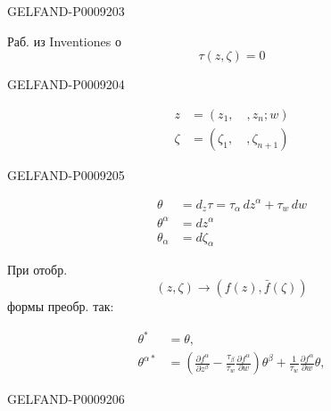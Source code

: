 \begin{GelfandAdjacentEvidence}{GELFAND-P000920}{3}


Раб. из Inventiones о 
\begin{equation*}
 \tau(z,\zeta)=0
 \tag{16}
\end{equation*}

\end{GelfandAdjacentEvidence}
\begin{GelfandAdjacentEvidence}{GELFAND-P000920}{4}


\begin{align*}
 z&=(z_1,\quad,z_n;w)\\
 \zeta&=(\zeta_1,\quad,\zeta_{n+1})
\end{align*}
\end{GelfandAdjacentEvidence}
\begin{GelfandAdjacentEvidence}{GELFAND-P000920}{5}


\begin{align*}
 \theta&=d_z\tau=\tau_\alpha\,dz^\alpha+\tau_w\,dw\\
 \theta^\alpha&=dz^\alpha\\
 \theta_\alpha&=d\zeta_\alpha
\end{align*}

При отобр.
\begin{equation*}
 (z,\zeta)\to(f(z),\bar f(\zeta))
 \tag{17}
\end{equation*}
формы преобр. так:

\begin{equation*}
 \begin{aligned}
 \theta^*&=\theta,\\
 \theta^{\alpha*}&=\left(\frac{\partial f^\alpha}{\partial z^\beta}
       -\frac{\tau_\beta}{\tau_w}\frac{\partial f^\alpha}{\partial w}\right)\theta^\beta
       +\frac{1}{\tau_w}\frac{\partial f^\alpha}{\partial w}\theta,
 \end{aligned}
 \tag{18}
\end{equation*}
\end{GelfandAdjacentEvidence}
\begin{GelfandAdjacentEvidence}{GELFAND-P000920}{6}

\end{GelfandAdjacentEvidence}
